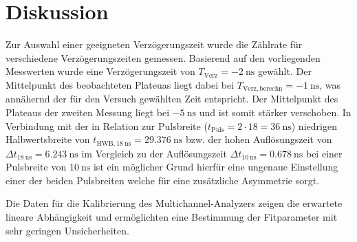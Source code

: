 \newpage
\section{Diskussion}
\label{sec:Diskussion}
Zur Auswahl einer geeigneten Verzögerungszeit wurde die Zählrate für verschiedene Verzögerungszeiten gemessen. Basierend auf den vorliegenden Messwerten wurde eine Verzögerungszeit von $T_{\mathrm{Verz}}=\SI{-2}{\nano\second}$ gewählt. Der Mittelpunkt des beobachteten Plateuas liegt dabei bei $T_{\mathrm{Verz,berechn}}=\SI{-1}{\nano\second}$, was annähernd der für den Versuch gewählten Zeit entspricht. Der Mittelpunkt des Plateaus der zweiten Messung liegt bei $\SI{-5}{\nano\second}$ und ist somit stärker verschoben. In Verbindung mit der in Relation zur Pulsbreite ($t_{\mathrm{Puls}}=2\cdot18=\SI{36}{\nano\second}$) niedrigen Halbwertsbreite von $t_{\mathrm{HWB},\SI{18}{\nano\second}}=\SI{29,376}{\nano\second}$  bzw. der hohen Auflösungszeit von $\Delta t_{\SI{18}{\nano\second}}=\SI{6,243}{\nano\second}$ im Vergleich zu der Auflösungszeit $\Delta t_{\SI{10}{\nano\second}}=\SI{0,678}{\nano\second}$ bei einer Pulsbreite von $\SI{10}{\nano\second}$ ist ein möglicher Grund hierfür eine ungenaue Einstellung einer der beiden Pulsbreiten welche für eine zusätzliche Asymmetrie sorgt.

Die Daten für die Kalibrierung des Multichannel-Analyzers zeigen die erwartete lineare Abhängigkeit und ermöglichten eine Bestimmung der Fitparameter mit sehr geringen Unsicherheiten.

